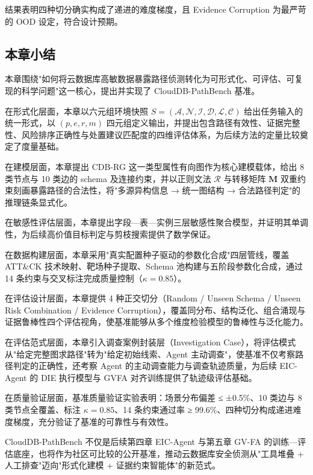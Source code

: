 \documentclass[a4paper,12pt]{ctexart}
\begin{document}
结果表明四种切分确实构成了递进的难度梯度，且 Evidence Corruption 为最严苛的 OOD 设定，符合设计预期。

\subsection{本章小结}

本章围绕"如何将云数据库高敏数据暴露路径侦测转化为可形式化、可评估、可复现的科学问题"这一核心，提出并实现了 CloudDB-PathBench 基准。

在形式化层面，本章以六元组环境快照 $S = (\mathcal{A}, \mathcal{N}, \mathcal{I}, \mathcal{D}, \mathcal{L}, \mathcal{C})$ 给出任务输入的统一形式，以 $(p, e, r, m)$ 四元组定义输出，并提出包含路径有效性、证据完整性、风险排序正确性与处置建议匹配度的四维评估体系，为后续方法的定量比较奠定了度量基础。

在建模层面，本章提出 CDB-RG 这一类型属性有向图作为核心建模载体，给出 8 类节点与 10 类边的 schema 及连接约束，并以正则文法 $\mathcal{R}$ 与转移矩阵 $\mathbf{M}$ 双重约束刻画暴露路径的合法性，将"多源异构信息 → 统一图结构 → 合法路径判定"的推理链条显式化。

在敏感性评估层面，本章提出字段—表—实例三层敏感性聚合模型，并证明其单调性，为后续高价值目标判定与剪枝搜索提供了数学保证。

在数据构建层面，本章采用"真实配置种子驱动的参数化合成"四层管线，覆盖 ATT\&CK 技术映射、靶场种子提取、Schema 池构建与五阶段参数化合成，通过 14 条约束与交叉标注完成质量控制（$\kappa = 0.85$）。

在评估设计层面，本章提供 4 种正交切分（Random / Unseen Schema / Unseen Risk Combination / Evidence Corruption），覆盖同分布、结构泛化、组合涌现与证据鲁棒性四个评估视角，使基准能够从多个维度检验模型的鲁棒性与泛化能力。

在评估范式层面，本章引入调查案例封装层（Investigation Case），将评估模式从"给定完整图求路径"转为"给定初始线索、Agent 主动调查"，使基准不仅考察路径判定的正确性，还考察 Agent 的主动调查能力与调查轨迹质量，为后续 EIC-Agent 的 DIE 执行模型与 GVFA 对齐训练提供了轨迹级评估基础。

在质量验证层面，基准质量验证实验表明：场景分布偏差 ≤ ±0.5\%、10 类边与 8 类节点全覆盖、标注 $\kappa = 0.85$、14 条约束通过率 ≥ 99.6\%、四种切分构成递进难度梯度，充分验证了基准的可靠性与有效性。

CloudDB-PathBench 不仅是后续第四章 EIC-Agent 与第五章 GV-FA 的训练—评估底座，也将作为社区可比较的公开基准，推动云数据库安全侦测从"工具堆叠 + 人工排查"迈向"形式化建模 + 证据约束智能体"的新范式。
\end{document}
